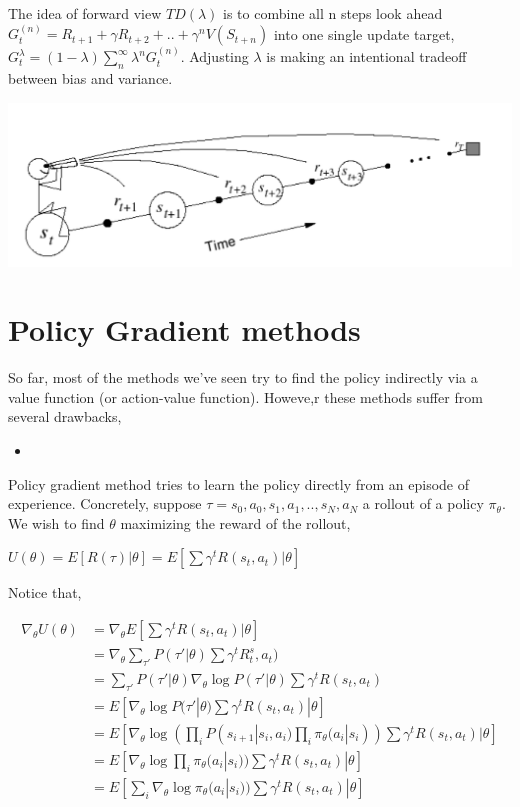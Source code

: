\documentclass[graybox]{svmult}
\begin{document}
The idea of forward view $TD(\lambda)$ is to combine all n steps look ahead $G^{(n)}_t = R_{t+1} + \gamma R_{t+2} + .. + \gamma^nV(S_{t+n})$ into one single update target, $G^{\lambda}_t = (1-\lambda)\sum^{\infty}_{n}\lambda^n G^{(n)}_t$. Adjusting $\lambda$ is making an intentional tradeoff between bias and variance.

\includegraphics[width=\textwidth]{forward.png}

\section{Policy Gradient methods}

So far, most of the methods we've seen try to find the policy indirectly via a value function (or action-value function). Howeve,r these methods suffer from several drawbacks, 

\begin{itemize}
\item 
\end{itemize}

Policy gradient method tries to learn the policy directly from an episode of experience. Concretely, suppose $\tau = s_0, a_0, s_1, a_1, .. , s_N, a_N$ a rollout of a policy $\pi_{\theta}$. We wish to find $\theta$ maximizing the reward of the rollout,

\begin{center}
 $U(\theta) = E[R(\tau) | \theta] = E[\sum \gamma^t R(s_t, a_t) | \theta]$
\end{center}

Notice that,

\begin{equation}
\begin{split}
\nabla_{\theta} U(\theta) & = \nabla_{\theta} E[\sum \gamma^t R(s_t, a_t) | \theta]  \\
 & = \nabla_{\theta} \sum_{\tau'} P(\tau' | \theta) \sum \gamma^t R^s_t, a_t) \\ & = \sum_{\tau'} P(\tau' | \theta) \nabla_{\theta} \log P(\tau' | \theta) \sum \gamma^t R(s_t, a_t) \\ & = E[ \nabla_{\theta} \log P(\tau' | \theta) \sum \gamma^t R(s_t, a_t) | \theta]  \\ & = E[ \nabla_{\theta} \log (\prod_i P(s_{i+1} | s_i, a_i) \prod_i \pi_{\theta} (a_i | s_i)) \sum \gamma^t R(s_t, a_t) | \theta] \\ & = E[ \nabla_{\theta} \log \prod_i \pi_{\theta} (a_i | s_i)) \sum \gamma^t R(s_t, a_t) | \theta] \\ & = E[ \sum_i \nabla_{\theta}  \log \pi_{\theta} (a_i | s_i)) \sum \gamma^t R(s_t, a_t) | \theta]
\end{split}
\end{equation}
\end{document}
